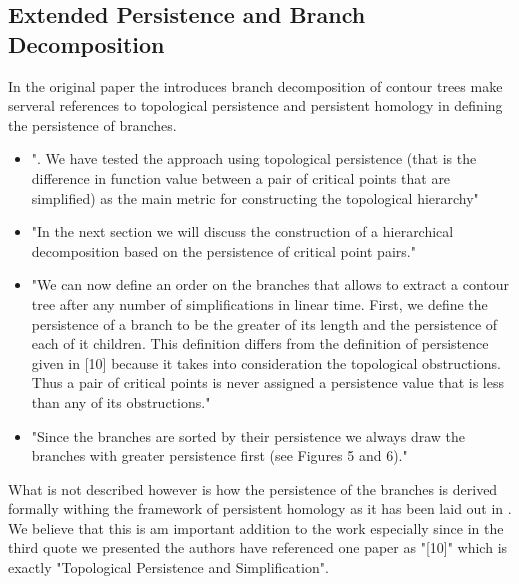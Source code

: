 \subsection{Extended Persistence and Branch Decomposition}


In the original paper the introduces branch decomposition of contour trees make serveral references to topological persistence and persistent homology in defining the persistence of branches.

\begin{itemize}
  \item ". We have tested the approach using topological persistence (that is the difference in function value between a pair of critical points that are simplified) as the main metric for constructing the topological hierarchy"
  \item  "In the next section we will discuss the construction of a hierarchical decomposition based on the persistence of critical point pairs."
  \item "We can now define an order on the branches that allows to extract a contour tree after any number of simplifications in linear time. First, we define the persistence of a branch to be the greater of its length and the persistence of each of it children. This definition differs from the definition of persistence given in [10] because it takes into consideration the topological obstructions. Thus a pair of critical points is never assigned a persistence value that is less than any of its obstructions."
  \item  "Since the branches are sorted by their persistence we always draw the branches with greater persistence first (see Figures 5
and 6)."
\end{itemize}

What is not described however is how the persistence of the branches is derived formally withing the framework of persistent homology as it has been laid out in \cite{persistence-original}. We believe that this is am important addition to the work especially since in the third quote we presented the authors have referenced one paper as "[10]" which is exactly "Topological Persistence and Simplification".

